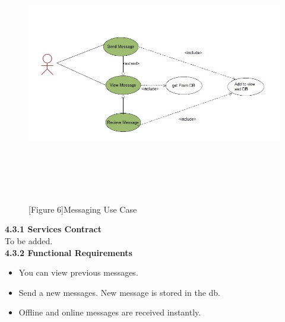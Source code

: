 \documentclass[29pt,a4paper]{moderncv}
\begin{document}
		\begin{figure}
			\centering
			\\ \includegraphics[width=6.0in, height=3.5in]{./messagingUseCase.jpg}
			\\\caption{[Figure 6]Messaging Use Case}\\
		\end{figure}

		\noindent\textbf{4.3.1 Services Contract}\\
		To be added.\\
		
		\noindent\textbf{4.3.2 Functional Requirements}
			\begin{itemize}
				\item You can view previous messages.
				\item Send a new messages. New message is stored in the db.
				\item Offline and online messages are received instantly.
			\end{itemize}
			
\end{document}
